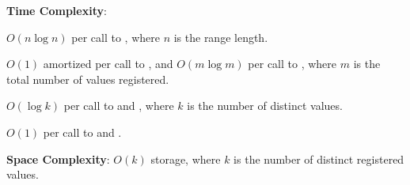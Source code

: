 \textbf{Time Complexity}:
\begin{compactitem}
  \item $O(n \log n)$ per call to , where $n$ is the range length.
  \item $O(1)$ amortized per call to , and $O(m \log m)$ per call to , where $m$ is the total number of values registered.
  \item $O(\log k)$ per call to  and , where $k$ is the number of distinct values.
  \item $O(1)$ per call to  and .
\end{compactitem}

\textbf{Space Complexity}: $O(k)$ storage, where $k$ is the number of distinct registered values.

